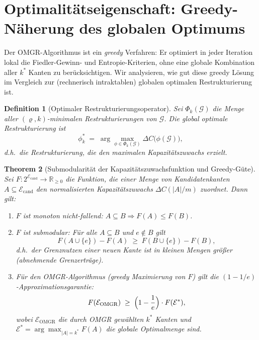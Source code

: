 ﻿\documentclass[12pt, a4paper, openany]{report}
\newtheorem{theorem}{Theorem}[chapter]
\newtheorem{definition}[theorem]{Definition}
\newcommand{\R}{\mathbb{R}}
\newcommand{\calG}{\mathcal{G}}
\newcommand{\calE}{\mathcal{E}}
\begin{document}
\section{Optimalitätseigenschaft: Greedy-Näherung des globalen Optimums}
\label{sec:algo_optimality}

Der OMGR-Algorithmus ist ein \emph{greedy} Verfahren: Er optimiert in
jeder Iteration lokal die Fiedler-Gewinn- und Entropie-Kriterien,
ohne eine globale Kombination aller $k^*$ Kanten zu berücksichtigen.
Wir analysieren, wie gut diese greedy Lösung im Vergleich zur
(rechnerisch intraktablen) globalen optimalen Restrukturierung ist.

\begin{definition}[Optimaler Restrukturierungsoperator]
\label{def:optimal_restr}
Sei $\Phi_k(\calG)$ die Menge aller $(\varrho, k)$-minimalen
Restrukturierungen von $\calG$.  Die \emph{global optimale Restrukturierung}
ist
\[
  \phi^*_k \;=\; \arg\max_{\phi \in \Phi_k(\calG)} \Delta C\!\bigl(\phi(\calG)\bigr),
\]
d.h.\ die Restrukturierung, die den maximalen Kapazitätszuwachs erzielt.
\end{definition}

\begin{theorem}[Submodularität der Kapazitätszuwachsfunktion und Greedy-Güte]
\label{thm:submodularity}
Sei $F : 2^{\calE_{\mathrm{cand}}} \to \R_{\geq 0}$ die Funktion, die
einer Menge von Kandidatenkanten $A \subseteq \calE_{\mathrm{cand}}$ den
normalisierten Kapazitätszuwachs $\Delta C(|A|/m)$ zuordnet.  Dann gilt:
\begin{enumerate}[label=(\roman*)]
  \item $F$ ist \emph{monoton nicht-fallend}:
    $A \subseteq B \Rightarrow F(A) \leq F(B)$.
  \item $F$ ist \emph{submodular}: Für alle $A \subseteq B$ und
    $e \notin B$ gilt
    \begin{equation}
      \label{eq:submodular}
      F(A \cup \{e\}) - F(A)
      \;\geq\;
      F(B \cup \{e\}) - F(B),
    \end{equation}
    d.h.\ der Grenznutzen einer neuen Kante ist in kleinen Mengen
    größer (abnehmende Grenzerträge).
  \item Für den OMGR-Algorithmus (greedy Maximierung von $F$) gilt
    die \emph{$(1-1/e)$-Approxi\-mationsgarantie}:
    \begin{equation}
      \label{eq:greedy_approx}
      F(\calE_{\mathrm{OMGR}}) \;\geq\; \Bigl(1 - \frac{1}{e}\Bigr) \cdot F(\calE^*),
    \end{equation}
    wobei $\calE_{\mathrm{OMGR}}$ die durch OMGR gewählten $k^*$ Kanten
    und $\calE^* = \arg\max_{|A|=k^*} F(A)$ die globale Optimalmenge sind.
\end{enumerate}
\end{theorem}
\end{document}
